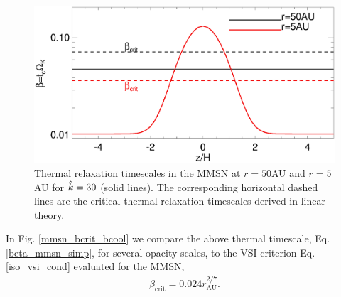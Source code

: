 \begin{figure}
  \includegraphics[width=\linewidth,clip=true,trim=0cm 0cm 0cm
  0cm]{figures/beta_compare}
  \caption{Thermal relaxation timescales in the MMSN at $r=50$AU
    and $r=5$AU for $\hat{k}=30$ (solid lines). The
    corresponding horizontal dashed lines are the critical thermal
    relaxation timescales derived in linear theory. 
    \label{beta_compare}}
\end{figure}











In Fig. \ref{mmsn_bcrit_bcool} we compare the above thermal timescale,
Eq. \ref{beta_mmsn_simp},  for several opacity scales, to  
the VSI criterion Eq. \ref{iso_vsi_cond} evaluated for the MMSN,     
\begin{align}\label{bcrit_mmsn}
  \beta_\mathrm{crit} = 0.024r_\mathrm{AU}^{2/7}. 
\end{align}


